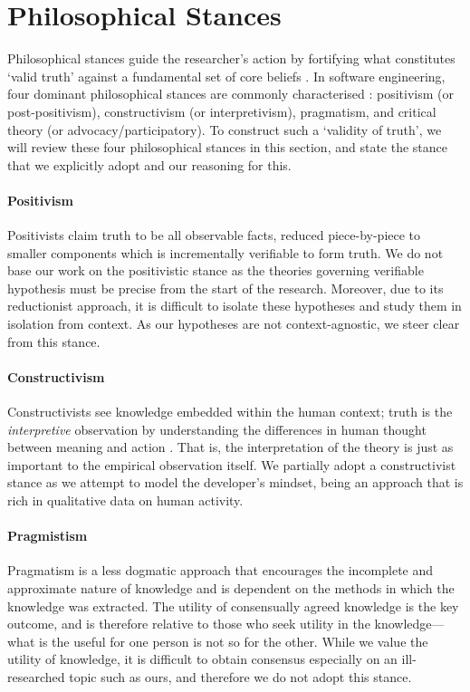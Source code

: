 \section{Philosophical Stances}
\label{sec:research-methodology:philosophical-stances}

Philosophical stances guide the researcher's action by fortifying what constitutes `valid truth' against a fundamental set of core beliefs \citep{Ritzer:1991ge}. In software engineering, four dominant philosophical stances are commonly characterised \citep{Creswell:2017vn,Petersen:2019ji}: positivism (or post-positivism), constructivism (or interpretivism), pragmatism, and critical theory (or advocacy/participatory). To construct such a `validity of truth', we will review these four philosophical stances in this section, and state the stance that we explicitly adopt and our reasoning for this.

\paragraph{Positivism}
Positivists claim truth to be all observable facts, reduced piece-by-piece to smaller components which is incrementally verifiable to form truth. We do not base our work on the positivistic stance as the theories governing verifiable hypothesis must be precise from the start of the research. Moreover, due to its reductionist approach, it is difficult to isolate these hypotheses and study them in isolation from context.
As our hypotheses are not context-agnostic, we steer clear from this stance.

\paragraph{Constructivism}
Constructivists see knowledge embedded within the human context; truth is the \textit{interpretive} observation by understanding the differences in human thought between meaning and action \citep{Klein:1999uv}. That is, the interpretation of the theory is just as important to the empirical observation itself.
We partially adopt a constructivist stance as we attempt to model the developer's mindset, being an approach that is rich in qualitative data on human activity.

\paragraph{Pragmistism}
Pragmatism is a less dogmatic approach that encourages the incomplete and approximate nature of knowledge and is dependent on the methods in which the knowledge was extracted. The utility of consensually agreed knowledge is the key outcome, and is therefore relative to those who seek utility in the knowledge---what is the useful for one person is not so for the other. While we value the utility of knowledge, it is difficult to obtain consensus especially on an ill-researched topic such as ours, and therefore we do not adopt this stance.

